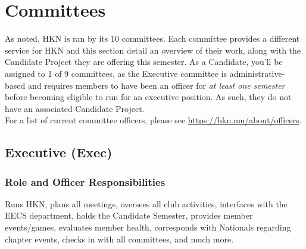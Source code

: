 \documentclass[11pt, article, oneside]{memoir}
\begin{document}

    \newpage
    \chapter{Committees}
    \label{ch:committees}

    As noted, HKN is ran by its 10 committees.
    Each committee provides a different service for HKN and this section detail an overview of their work, along with the Candidate Project they are offering this semester.
    As a Candidate, you'll be assigned to 1 of 9 committees, as the Executive committee is administrative-based and requires members to have been an officer for \emph{at least one semester} before becoming eligible to run for an executive position.
    As such, they do not have an associated Candidate Project. \\

    For a list of current committee officers, please see \url{https://hkn.mu/about/officers}.

    \section{Executive (Exec)}
    \subsection{Role and Officer Responsibilities}
        Runs HKN, plans all meetings, oversees all club activities, interfaces with the EECS department, holds the Candidate Semester, provides member events/games, evaluates member health, corresponds with Nationals regarding chapter events, checks in with all committees, and much more.
\end{document}
